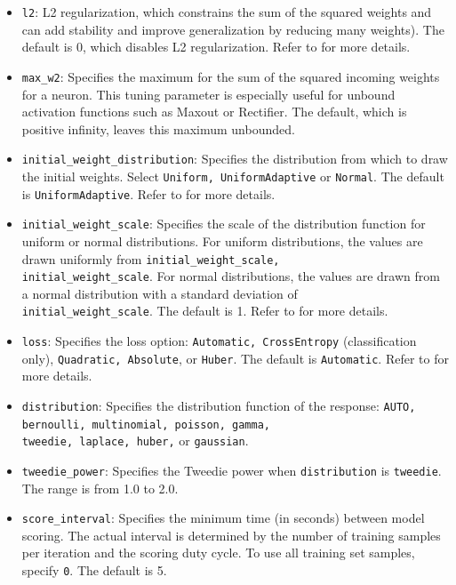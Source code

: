 {{\begin{itemize}
\item \texttt{l2}: L2 regularization, which constrains the sum of the squared weights and can add stability and improve generalization by reducing many weights). The default is 0, which disables L2 regularization. Refer to {\textbf{}} for more details.

\item \texttt{max\_w2}: Specifies the maximum for the sum of the squared incoming weights for a neuron. This tuning parameter is especially useful for unbound activation functions such as Maxout or Rectifier. The default, which is positive infinity, leaves this maximum unbounded.

\item \texttt{initial\_weight\_distribution}: Specifies the distribution from which to draw the initial weights. Select \texttt{Uniform, UniformAdaptive} or \texttt{Normal}. The default is \texttt{UniformAdaptive}. Refer to {\textbf{}} for more details.

\item \texttt{initial\_weight\_scale}: Specifies the scale of the distribution function for uniform or normal distributions. For uniform distributions, the values are drawn uniformly from \texttt{initial\_weight\_scale, \\ initial\_weight\_scale}. For normal distributions, the values are drawn from a normal distribution with a standard deviation of \\ \texttt{initial\_weight\_scale}. The default is 1. Refer to {\textbf{}} for more details.

\item \texttt{loss}: Specifies the loss option: \texttt{Automatic, CrossEntropy} (classification only), \texttt{Quadratic, Absolute}, or \texttt{Huber}. The default is \texttt{Automatic}. Refer to {\textbf{}} for more details.

\item \texttt{distribution}: Specifies the distribution function of the response: \texttt{AUTO, bernoulli, multinomial, poisson, gamma, \\ tweedie, laplace, huber,} or \texttt{gaussian}. 

\item \texttt{tweedie\_power}: Specifies the Tweedie power when \texttt{distribution} is  \texttt{tweedie}. The range is from 1.0 to 2.0. 

\item \texttt{score\_interval}: Specifies the minimum time (in seconds) between model scoring. The actual interval is determined by the number of training samples per iteration and the scoring duty cycle. To use all training set samples, specify \texttt{0}. The default is 5.


\end{itemize}}}
